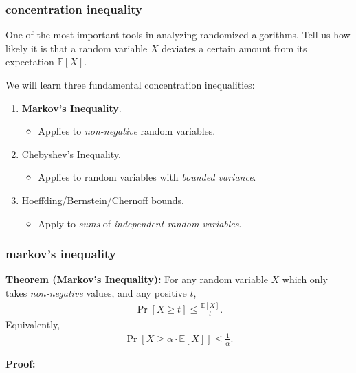 \documentclass[]{beamer}
\newcommand{\E}{\mathbb{E}}
\begin{document}
	\begin{frame}
		\frametitle{concentration inequality}
		One of the most important tools in analyzing randomized algorithms. Tell us how likely it is that a random variable $X$ deviates a certain amount from its expectation $\E[X]$. 
		
		We will learn three fundamental concentration inequalities:
		\begin{enumerate}[label=\arabic*.]
			\item \textbf{\alert{Markov's Inequality}}.
			\begin{itemize}
				\item Applies to \emph{non-negative} random variables.
			\end{itemize}
			\item Chebyshev's Inequality.
			\begin{itemize}
				\item Applies to random variables with \emph{bounded variance}.
			\end{itemize}
			\item Hoeffding/Bernstein/Chernoff bounds.
			\begin{itemize}
				\item Apply to \emph{sums} of \emph{independent random variables}.
			\end{itemize}
		\end{enumerate}
		
	\end{frame}
	
	\begin{frame}
		\frametitle{markov's inequality}
		\textbf{Theorem (Markov's Inequality):} For any random variable $X$ which only takes \emph{non-negative} values, and any positive $t$, 
		\begin{align*}
			\Pr[X \geq t] \leq \frac{\E[X]}{t}.
		\end{align*}
		Equivalently,
		\begin{align*}
			\Pr[X \geq \alpha \cdot\E[X]] \leq \frac{1}{\alpha}.
		\end{align*}
		
		\textbf{Proof:}
		\vspace{9em}
	\end{frame}
	
\end{document}
